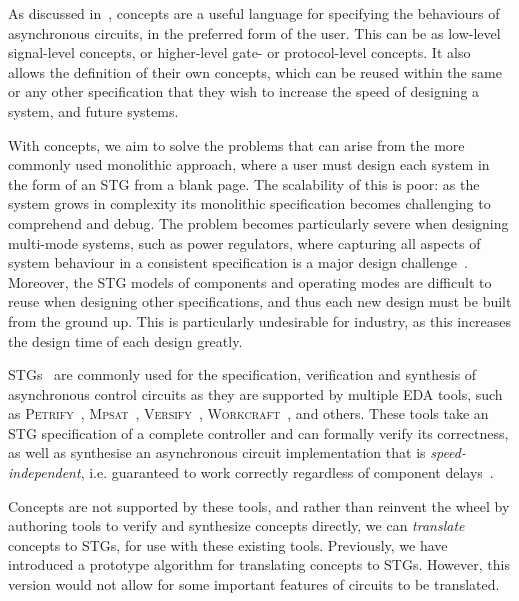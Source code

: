 \documentclass[british,conference,compsoc]{IEEEtran}
\newcommand{\noun}[1]{\textsc{#1}}
\begin{document}
As discussed in~\cite{2015_Beaumont_MEMOCODE}, concepts are a useful language for specifying
the behaviours of asynchronous circuits, in the preferred form of the user. This can be as low-level 
signal-level concepts, or higher-level gate- or protocol-level concepts. It also allows the definition of 
their own concepts, which can be reused within the same or any other specification that they wish
to increase the speed of designing a system, and future systems. 

With concepts, we aim to solve the problems that can arise from the more commonly used
monolithic approach, where a user must design each system in the form of an STG from a blank page. 
The scalability of this is poor: as the system grows in complexity its monolithic specification becomes 
challenging to comprehend and debug. The problem becomes particularly severe when designing 
multi-mode systems, such as power regulators, where capturing all aspects of system behaviour in a
consistent specification is a major design challenge~\cite{2014_sokolov_ftfc}\cite{sokolov2015design}. 
Moreover, the STG models of components and  operating modes are difficult to reuse when designing 
other specifications, and thus each new design must be built from the ground up. This is particularly 
undesirable for industry, as this increases the design time of each design greatly. 


STGs~\cite{Chu_1987_phd}\cite{Rosenblum_1985_tpn}
are commonly used for the specification,
verification and synthesis of asynchronous control circuits as they are
supported by multiple EDA tools, such as \noun{Petrify}~\cite{Cortadella},
\noun{Mpsat}~\cite{khomenko2004detecting}, \noun{Versify}~\cite{i1997formal},
\noun{Workcraft}~\cite{2007_poliakov_workcraft}\cite{Workcraft_website}, and
others.
These tools take an STG specification of a complete controller and can
formally verify its correctness, as well as synthesise an asynchronous
circuit implementation that is \emph{speed-independent}, i.e. guaranteed
to work correctly regardless of component delays~\cite{Muller_1959_ts}.

Concepts are not supported by these tools, and rather than reinvent the wheel by authoring tools
to verify and synthesize concepts directly, we can \emph{translate} concepts to STGs, for use with 
these existing tools. Previously, we have introduced a prototype algorithm for translating concepts
to STGs. However, this version would not allow for some important features of circuits to be
translated. 
\end{document}
